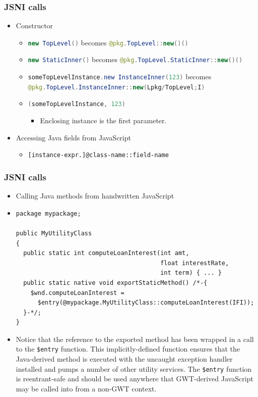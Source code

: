 \documentclass[10pt,table, xcolor=pdflatex]{beamer}
\newcommand{\inlinejava}{\lstinline[language={Java}]}
\newcommand{\itmspace}[2]{\item #2 \vspace{#1}}
\begin{document}
\begin{frame}[fragile]\frametitle{JSNI calls}
	\begin{itemize}
		\item Constructor
          \begin{itemize}
        	\item \inlinejava{new TopLevel()} becomes \inlinejava{@pkg.TopLevel::new()()}
            \itmspace{0.5em} {\inlinejava{new StaticInner()} becomes \inlinejava{@pkg.TopLevel.StaticInner::new()()}}
            \item \inlinejava{someTopLevelInstance.new InstanceInner(123)} becomes \inlinejava{@pkg.TopLevel.InstanceInner::new(Lpkg/TopLevel;I)}
            \item[] \inlinejava{(someTopLevelInstance, 123)}
            \begin{itemize}
            	\item Enclosing instance is the first parameter.
            \end{itemize}
          \end{itemize}
        \smallskip
        \item Accessing Java fields from JavaScript
          \begin{itemize}
        	\item \verb'[instance-expr.]@class-name::field-name'
          \end{itemize}
	\end{itemize}
\end{frame}


\begin{frame}[fragile]\frametitle{JSNI calls}
	\begin{itemize}
		\item Calling Java methods from handwritten JavaScript
        \item[]
        	\lstset{language=Java, basicstyle=\footnotesize\ttfamily}
            \begin{lstlisting}
package mypackage;

public MyUtilityClass
{
  public static int computeLoanInterest(int amt, 
                                        float interestRate,
                                        int term) { ... }
  public static native void exportStaticMethod() /*-{
    $wnd.computeLoanInterest =
      $entry(@mypackage.MyUtilityClass::computeLoanInterest(IFI));
  }-*/;
}
            \end{lstlisting}
        \item {\small Notice that the reference to the exported method has been wrapped in a call to the \texttt{\$entry} function. This implicitly-defined function ensures that the Java-derived method is executed with the uncaught exception handler installed and pumps a number of other utility services. The \texttt{\$entry} function is reentrant-safe and should be used anywhere that GWT-derived JavaScript may be called into from a non-GWT context.}
	\end{itemize}
\end{frame}
\end{document}
